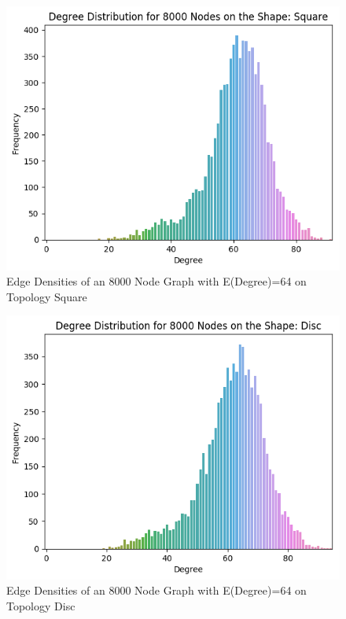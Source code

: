 \documentclass{article}
\begin{document}
    \begin{figure}
      \centering
      \label{square_edge_density}
      \includegraphics[width=1 \textwidth]{square/generation/edge_density/8000_64.png}
      \caption{Edge Densities of an 8000 Node Graph with E(Degree)=64 on Topology Square}
    \end{figure}

    \begin{figure}
      \centering
      \label{disc_edge_density}
      \includegraphics[width=1 \textwidth]{disc/generation/edge_density/8000_64.png}
      \caption{Edge Densities of an 8000 Node Graph with E(Degree)=64 on Topology Disc}
    \end{figure}
\end{document}
